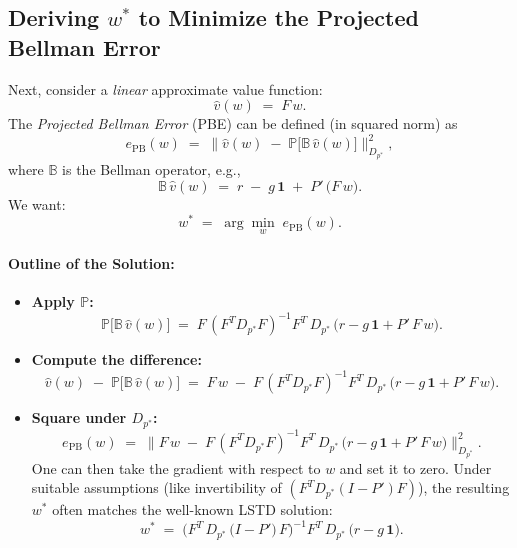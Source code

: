 \subsection{Deriving \texorpdfstring{$w^*$}{w*} to Minimize the Projected Bellman Error}

Next, consider a \emph{linear} approximate value function:
\[
\hat{v}(w) \;=\; F\,w.
\]
The \emph{Projected Bellman Error} (PBE) can be defined (in squared norm) as
\[
e_{\mathrm{PB}}(w)
\;=\;
\bigl\|
\hat{v}(w) 
\;-\;
\mathbb{P}\bigl[\mathbb{B}\,\hat{v}(w)\bigr]
\bigr\|_{D_{p^*}}^2,
\]
where $\mathbb{B}$ is the Bellman operator, e.g.,
\[
\mathbb{B}\,\hat{v}(w)
\;=\;
r \;-\; g\,\mathbf{1}
\;+\;
P'\,\bigl(F\,w\bigr).
\]
We want:
\[
w^*
\;=\;
\arg\min_{w}
\;e_{\mathrm{PB}}(w).
\]

\paragraph{Outline of the Solution:}
\begin{itemize}
    \item \textbf{Apply $\mathbb{P}$:} 
    \[
    \mathbb{P}\bigl[\mathbb{B}\,\hat{v}(w)\bigr]
    \;=\;
    F\,(F^T D_{p^*} F)^{-1} F^T\,D_{p^*}\,\bigl(r - g\,\mathbf{1} + P'\,F\,w\bigr).
    \]
    
    \item \textbf{Compute the difference:}
    \[
    \hat{v}(w) 
    \;-\;
    \mathbb{P}\bigl[\mathbb{B}\,\hat{v}(w)\bigr]
    \;=\;
    F\,w
    \;-\;
    F\,(F^T D_{p^*} F)^{-1} F^T\,D_{p^*}\,\bigl(r - g\,\mathbf{1} + P'\,F\,w\bigr).
    \]
    
    \item \textbf{Square under $D_{p^*}$:}
    \[
    e_{\mathrm{PB}}(w)
    \;=\;
    \bigl\|
    F\,w
    \;-\;
    F\,(F^T D_{p^*} F)^{-1} F^T\,D_{p^*}\,\bigl(r - g\,\mathbf{1} + P'\,F\,w\bigr)
    \bigr\|_{D_{p^*}}^2.
    \]
    One can then take the gradient with respect to $w$ and set it to zero. 
    Under suitable assumptions (like invertibility of $(F^T D_{p^*} (I - P') F)$), 
    the resulting $w^*$ often matches the well-known LSTD solution:
    \[
    w^*
    \;=\;
    \bigl(F^T\,D_{p^*}\,\bigl(I - P'\bigr)\,F\bigr)^{-1}
    F^T\,D_{p^*}\,\bigl(r - g\,\mathbf{1}\bigr).
    \]
\end{itemize}


